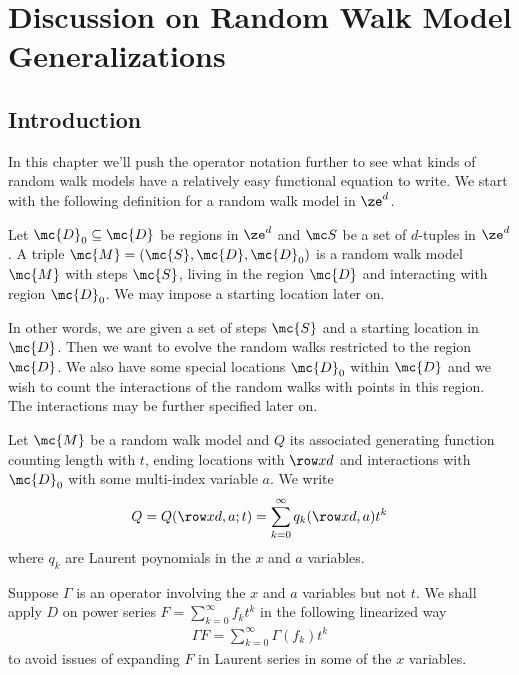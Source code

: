\chapter{Discussion on Random Walk Model Generalizations}

\section{Introduction}

In this chapter we'll push the operator notation further to see what kinds of random walk models have a relatively easy functional equation to write. We start with the following definition for a random walk model in $\ze^d$.
\begin{definition} Let $\mc{D}_0 \subseteq \mc{D}$ be regions in $\ze^d$ and $\mc S$ be a set of $d$-tuples in $\ze^d$. A triple $\mc{M} = (\mc{S}, \mc{D},\mc{D}_0)$ is a random walk model $\mc{M}$ with steps $\mc{S}$, living in the region $\mc{D}$ and interacting with region $\mc{D}_0$. We may impose a starting location later on.
\end{definition}
In other words, we are given a set of steps $\mc{S}$ and a starting location in $\mc{D}$. Then we want to evolve the random walks restricted to the region $\mc{D}$. We also have some special locations $\mc{D}_0$ within $\mc{D}$ and we wish to count the interactions of the random walks with points in this region. The interactions may be further specified later on.
\begin{definition} Let $\mc{M}$ be a random walk model and $Q$ its associated generating function counting length with $t$, ending locations with $\row xd$ and interactions with $\mc{D}_0$ with some multi-index variable $a$. We write
\begin{align}
	Q = Q(\row xd,a;t) = \sum_{k=0}^{\infty} q_k(\row xd, a)t^k
\end{align}
where $q_k$ are Laurent poynomials in the $x$ and $a$ variables. 
\end{definition}
\begin{definition} Suppose $\Gamma$ is an operator involving the $x$ and $a$ variables but not $t$. We shall apply $D$ on power series $F = \sum_{k=0}^\infty f_k t^k$ in the following linearized way
\begin{align}
	\Gamma F = \sum_{k=0}^\infty \Gamma (f_k) t^k
\end{align}
to avoid issues of expanding $F$ in Laurent series in some of the $x$ variables.
\end{definition}

